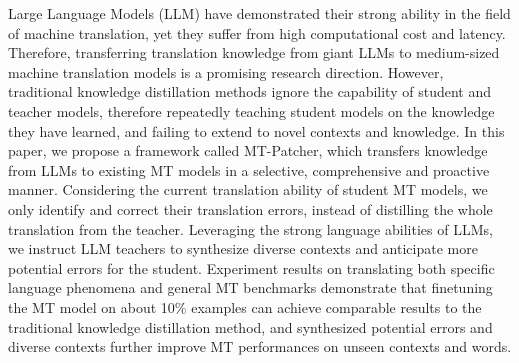 Large Language Models (LLM) have demonstrated their strong ability in the field of machine translation, yet they suffer from high computational cost and latency. Therefore, transferring translation knowledge from giant LLMs to medium-sized machine translation models is a promising research direction.  However, traditional knowledge distillation methods ignore the capability of student and teacher models, therefore repeatedly teaching student models on the knowledge they have learned, and failing to extend to novel contexts and knowledge. In this paper, we propose a framework called MT-Patcher, which transfers knowledge from LLMs to existing MT models in a selective, comprehensive and proactive manner. Considering the current translation ability of student MT models, we only identify and correct their translation errors, instead of distilling the whole translation from the teacher. Leveraging the strong language abilities of LLMs, we instruct LLM teachers to synthesize diverse contexts and anticipate more potential errors for the student. Experiment results on translating both specific language phenomena and general MT benchmarks demonstrate that finetuning the MT model on about 10\% examples can achieve comparable results to the traditional knowledge distillation method, and synthesized potential errors and diverse contexts further improve MT performances on unseen contexts and words.